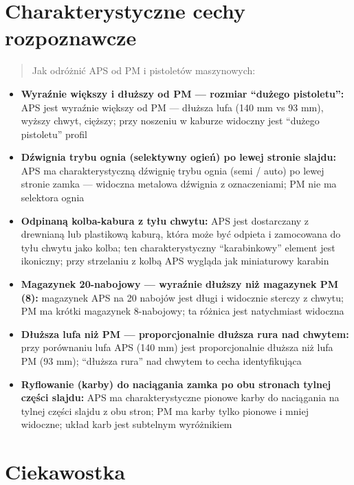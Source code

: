 \documentclass[12pt,openany,oneside]{book}
\providecommand{\tightlist}{%
  \setlength{\itemsep}{0pt}\setlength{\parskip}{0pt}}
\begin{document}
\section{Charakterystyczne cechy
rozpoznawcze}\label{charakterystyczne-cechy-rozpoznawcze-88}

\begin{quote}
Jak odróżnić APS od PM i pistoletów maszynowych:
\end{quote}

\begin{itemize}
\tightlist
\item
  \textbf{Wyraźnie większy i dłuższy od PM --- rozmiar ``dużego
  pistoletu'':} APS jest wyraźnie większy od PM --- dłuższa lufa (140 mm
  vs 93 mm), wyższy chwyt, cięższy; przy noszeniu w kaburze widoczny
  jest ``dużego pistoletu'' profil
\item
  \textbf{Dźwignia trybu ognia (selektywny ogień) po lewej stronie
  slajdu:} APS ma charakterystyczną dźwignię trybu ognia (semi / auto)
  po lewej stronie zamka --- widoczna metalowa dźwignia z oznaczeniami;
  PM nie ma selektora ognia
\item
  \textbf{Odpinaną kolba-kabura z tyłu chwytu:} APS jest dostarczany z
  drewnianą lub plastikową kaburą, która może być odpieta i zamocowana
  do tyłu chwytu jako kolba; ten charakterystyczny ``karabinkowy''
  element jest ikoniczny; przy strzelaniu z kolbą APS wygląda jak
  miniaturowy karabin
\item
  \textbf{Magazynek 20-nabojowy --- wyraźnie dłuższy niż magazynek PM
  (8):} magazynek APS na 20 nabojów jest długi i widocznie sterczy z
  chwytu; PM ma krótki magazynek 8-nabojowy; ta różnica jest natychmiast
  widoczna
\item
  \textbf{Dłuższa lufa niż PM --- proporcjonalnie dłuższa rura nad
  chwytem:} przy porównaniu lufa APS (140 mm) jest proporcjonalnie
  dłuższa niż lufa PM (93 mm); ``dłuższa rura'' nad chwytem to cecha
  identyfikująca
\item
  \textbf{Ryflowanie (karby) do naciągania zamka po obu stronach tylnej
  części slajdu:} APS ma charakterystyczne pionowe karby do naciągania
  na tylnej części slajdu z obu stron; PM ma karby tylko pionowe i mniej
  widoczne; układ karb jest subtelnym wyróżnikiem
\end{itemize}

\section{Ciekawostka}\label{ciekawostka-88}
\end{document}
